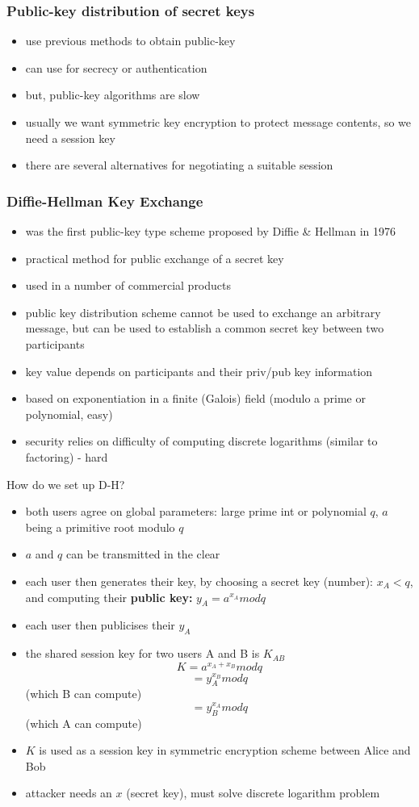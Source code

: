 \documentclass{article}
\begin{document}
\subsubsection{Public-key distribution of secret keys}
\begin{itemize}
    \item use previous methods to obtain public-key
    \item can use for secrecy or authentication
    \item but, public-key algorithms are slow
    \item usually we want symmetric key encryption to protect message contents, so we need a session key
    \item there are several alternatives for negotiating a suitable session
\end{itemize}
\subsubsection{Diffie-Hellman Key Exchange}
\begin{itemize}
    \item was the first public-key type scheme proposed by Diffie \& Hellman in 1976
    \item practical method for public exchange of a secret key
    \item used in a number of commercial products
    \item public key distribution scheme cannot be used to exchange an arbitrary message, but can be used to establish a common secret key between two participants
    \item key value depends on participants and their priv/pub key information
    \item based on exponentiation in a finite (Galois) field (modulo a prime or polynomial, easy)
    \item security relies on difficulty of computing discrete logarithms (similar to factoring) - hard
\end{itemize}
How do we set up D-H?
\begin{itemize}
    \item both users agree on global parameters: large prime int or polynomial $q$, $a$ being a primitive root modulo $q$
    \item $a$ and $q$ can be transmitted in the clear
    \item each user then generates their key, by choosing a secret key (number): $x_A < q$, and computing their \textbf{public key:} $y_A = a^{x_A} mod q$
    \item each user then publicises their $y_A$
    \item the shared session key for two users A and B is $K_{AB}$
    $$K = a^{x_A + x_B} mod q$$
    $$= y_{A}^{x_B} mod q$$ (which B can compute)
    $$= y_{B}^{x_A} mod q$$ (which A can compute)
    \item $K$ is used as a session key in symmetric encryption scheme between Alice and Bob
    \item attacker needs an $x$ (secret key), must solve discrete logarithm problem 
\end{itemize}
\end{document}
